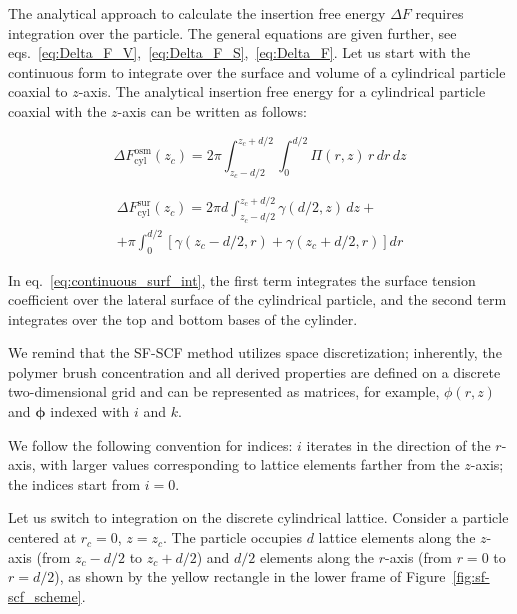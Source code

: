 \documentclass[10pt, a4paper]{article}
\begin{document}
\begin{multicols}{2}

The analytical approach to calculate the insertion free energy $\Delta F$ requires integration over the particle.
The general equations are given further, see eqs.~\ref{eq:Delta_F_V},~\ref{eq:Delta_F_S},~\ref{eq:Delta_F}.
Let us start with the continuous form to integrate over the surface and volume of a cylindrical particle coaxial to $z$-axis.
The analytical insertion free energy for a cylindrical particle coaxial with the $z$-axis can be written as follows:

\begin{equation}
    \Delta F_{\textrm{cyl}}^{\textrm{osm}}(z_c) = 2 \pi \int_{z_c - d/2}^{z_c + d/2} \int_{0}^{d/2} \Pi(r, z) \, r \, dr \, dz
\end{equation}

\begin{equation}\label{eq:continuous_surf_int}
    \begin{aligned}
        \Delta F_{\textrm{cyl}}^{\textrm{sur}}(z_c) = 2 \pi d \int_{z_c - d/2}^{z_c + d/2} \gamma(d/2, z) \, dz +\\
        + \pi \int_{0}^{d/2} \left[ \gamma(z_c - d/2, r) + \gamma(z_c + d/2, r) \right] dr
    \end{aligned}
\end{equation}

In eq.~\ref{eq:continuous_surf_int}, the first term integrates the surface tension coefficient over the lateral surface of the cylindrical particle, and the second term integrates over the top and bottom bases of the cylinder.

We remind that the SF-SCF method utilizes space discretization; inherently, the polymer brush concentration and all derived properties are defined on a discrete two-dimensional grid and can be represented as matrices, for example, $\phi(r, z)$ and $\boldsymbol{\phi}$ indexed with $i$ and $k$.

We follow the following convention for indices: $i$ iterates in the direction of the $r$-axis, with larger values corresponding to lattice elements farther from the $z$-axis; the indices start from $i=0$.

Let us switch to integration on the discrete cylindrical lattice.
Consider a particle centered at $r_c = 0$, $z = z_c$.
The particle occupies $d$ lattice elements along the $z$-axis (from $z_c - d/2$ to $z_c + d/2$) and $d/2$ elements along the $r$-axis (from $r = 0$ to $r = d/2$), as shown by the yellow rectangle in the lower frame of Figure~\ref{fig:sf-scf_scheme}.


\end{multicols}
\end{document}
